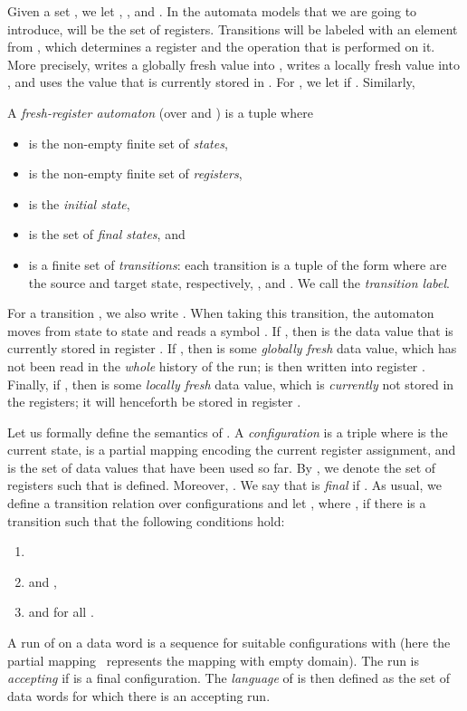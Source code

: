 \documentclass{LMCS}
\begin{document}
Given a set , we let ,
, and .
In the automata models that we are going to introduce,  will be the set of registers.
Transitions will be labeled with an element
from , which determines a register and the operation that is
performed on it. More precisely,  writes a globally fresh value into , 
writes a locally fresh value into , and  uses the value that is currently stored in . For , we let  if
. Similarly,


\begin{defi}
  A \emph{fresh-register automaton} (over  and ) is a tuple  where
  \begin{itemize}
  \item  is the non-empty finite set of \emph{states},
  \item  is the non-empty finite set of \emph{registers},
  \item  is the \emph{initial state},
  \item  is the set of \emph{final
      states}, and
  \item  is a finite set of \emph{transitions}: each
    transition is a tuple of the form  where  are the source and target state, respectively, , and . We call  the
    \emph{transition label}.
  \end{itemize}
\end{defi}

\noindent For a transition , we also write . When taking this transition, the automaton
moves from state  to state  and reads a symbol . If , then  is the
data value that is currently stored in register . If , then  is some \emph{globally fresh} data
value, which has not been read in the \emph{whole} history of the run;
 is then written into register . Finally, if , then  is some \emph{locally fresh} data
value, which is \emph{currently} not stored in the registers; it will
henceforth be stored in register .

Let us formally define the semantics of . A \emph{configuration} is a
triple  where  is the current
state,  is a partial mapping encoding the
current register assignment, and  is the set of data values that have
been used so far. By , we denote the set of registers  such that  is defined.
Moreover, .
We say that  is \emph{final} if . As usual, we define a transition relation over
configurations and let , where , if there is
a transition  such that the following
conditions hold:
\begin{enumerate}
\item 
\item  and
  ,
\item  and  for all
  .
\end{enumerate}
A run of  on a data word  is a sequence
 for suitable configurations
 with 
(here the partial mapping~ represents the mapping with
empty domain).
The run is \emph{accepting} if  is a final configuration. The
\emph{language}  of 
is then defined as the set of data words for which there is an
accepting run.
\end{document}
